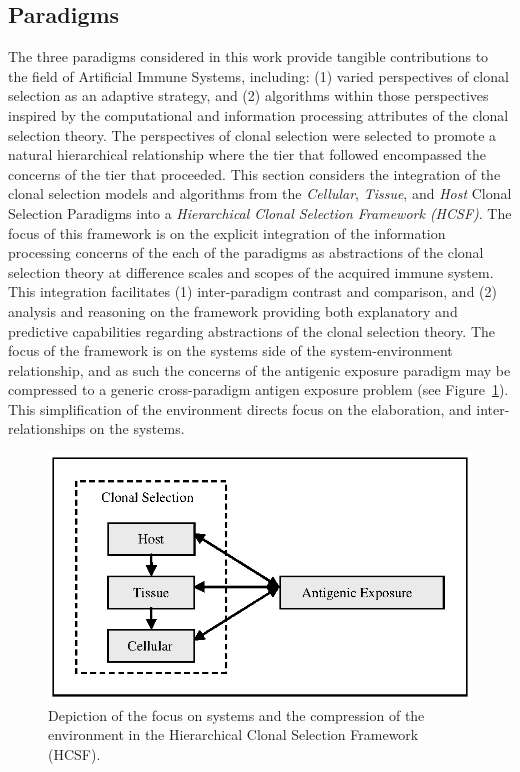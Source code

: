 \subsection{Paradigms}
\label{sec:framework:hcsf:paradigms}
The three paradigms considered in this work provide tangible contributions to the field of Artificial Immune Systems, including: (1) varied perspectives of clonal selection as an adaptive strategy, and (2) algorithms within those perspectives inspired by the computational and information processing attributes of the clonal selection theory. The perspectives of clonal selection were selected to promote a natural hierarchical relationship where the tier that followed encompassed the concerns of the tier that proceeded. 
This section considers the integration of the clonal selection models and algorithms from the \emph{Cellular}, \emph{Tissue}, and \emph{Host} Clonal Selection Paradigms into a \emph{Hierarchical Clonal Selection Framework (HCSF)}. 
The focus of this framework is on the explicit integration of the information processing concerns of the each of the paradigms as abstractions of the clonal selection theory at difference scales and scopes of the acquired immune system.
This integration facilitates (1) inter-paradigm contrast and comparison, and (2) analysis and reasoning on the framework providing both explanatory and predictive capabilities regarding abstractions of the clonal selection theory.
The focus of the framework is on the systems side of the system-environment relationship, and as such the concerns of the antigenic exposure paradigm may be compressed to a generic cross-paradigm antigen exposure problem (see Figure~\ref{fig:framework:hcsf:interpretation:expanded-flat}). This simplification of the environment directs focus on the elaboration, and inter-relationships on the systems. 

\begin{figure}[htp]
	\centering
	\includegraphics[scale=0.85]{Framework/framework-integration-expanded-flat}
	\caption{Depiction of the focus on systems and the compression of the environment in the Hierarchical Clonal Selection Framework (HCSF).}
	\label{fig:framework:hcsf:interpretation:expanded-flat}
\end{figure}

